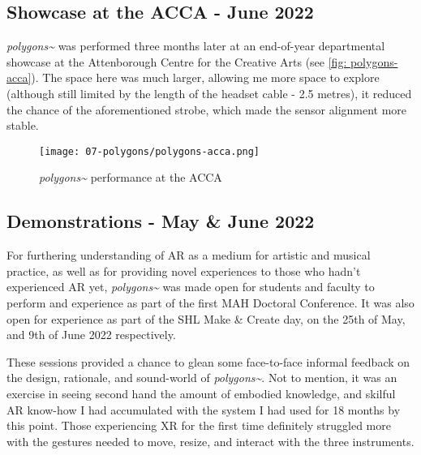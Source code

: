 \subsection{Showcase at the ACCA - June 2022} \label{sec: polygons-performances-acca}
\textit{polygons\textasciitilde{}} was performed three months later at an end-of-year departmental showcase at the Attenborough Centre for the Creative Arts (see \autoref{fig: polygons-acca}). The space here was much larger, allowing me more space to explore (although still limited by the length of the headset cable - 2.5 metres), it reduced the chance of the aforementioned strobe, which made the sensor alignment more stable.

\begin{figure}
    \centering
    \texttt{[image: 07-polygons/polygons-acca.png]}
    \caption{\textit{polygons\textasciitilde{}} performance at the ACCA}
    \label{fig: polygons-acca}
\end{figure}

\subsection{Demonstrations - May \& June 2022} \label{sec: polygons-performances-demos}
For furthering understanding of AR as a medium for artistic and musical practice, as well as for providing novel experiences to those who hadn't experienced AR yet, \textit{polygons\textasciitilde{}} was made open for students and faculty to perform and experience as part of the first MAH Doctoral Conference. It was also open for experience as part of the SHL Make \& Create day, on the 25th of May, and 9th of June 2022 respectively.

These sessions provided a chance to glean some face-to-face informal feedback on the design, rationale, and sound-world of \textit{polygons\textasciitilde{}}. Not to mention, it was an exercise in seeing second hand the amount of embodied knowledge, and skilful AR know-how I had accumulated with the system I had used for 18 months by this point. Those experiencing XR for the first time definitely struggled more with the gestures needed to move, resize, and interact with the three instruments.




